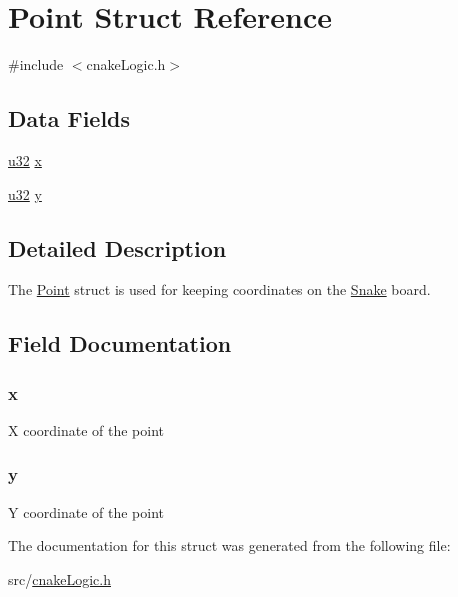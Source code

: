 \hypertarget{struct_point}{}\section{Point Struct Reference}
\label{struct_point}


{\ttfamily \#include $<$cnake\+Logic.\+h$>$}

\subsection*{Data Fields}
\begin{DoxyCompactItemize}
\item 
\hyperlink{my_lib_8h_a10e94b422ef0c20dcdec20d31a1f5049}{u32} \hyperlink{struct_point_af80df1bdae91e5f76236e6ed1110825d}{x}
\item 
\hyperlink{my_lib_8h_a10e94b422ef0c20dcdec20d31a1f5049}{u32} \hyperlink{struct_point_a11e444dd61d48abbdd34eed23186cb4b}{y}
\end{DoxyCompactItemize}


\subsection{Detailed Description}
The \hyperlink{struct_point}{Point} struct is used for keeping coordinates on the \hyperlink{struct_snake}{Snake} board. 

\subsection{Field Documentation}
\subsubsection[{\texorpdfstring{x}{x}}]{ x}\hypertarget{struct_point_af80df1bdae91e5f76236e6ed1110825d}{}\label{struct_point_af80df1bdae91e5f76236e6ed1110825d}
X coordinate of the point 
\subsubsection[{\texorpdfstring{y}{y}}]{ y}\hypertarget{struct_point_a11e444dd61d48abbdd34eed23186cb4b}{}\label{struct_point_a11e444dd61d48abbdd34eed23186cb4b}
Y coordinate of the point 

The documentation for this struct was generated from the following file\+:\begin{DoxyCompactItemize}
\item 
src/\hyperlink{cnake_logic_8h}{cnake\+Logic.\+h}\end{DoxyCompactItemize}

